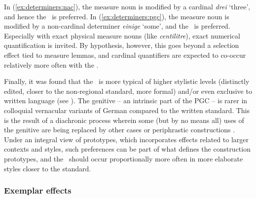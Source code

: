 \begin{exe}
  \ex\label{ex:determiners} 
  \begin{xlist}
  \end{xlist}
\end{exe}

In (\ref{ex:determiners:nac}), the measure noun is modified by a cardinal \textit{drei} `three', and hence the \NACa\ is preferred.
In (\ref{ex:determiners:pgc}), the measure noun is modified by a non-cardinal determiner \textit{einige} `some', and the \PGCa\ is preferred.
Especially with exact physical measure nouns (like \textit{centilitre}), exact numerical quantification is invited.
By hypothesis, however, this goes beyond a selection effect tied to measure lemmas, and cardinal quantifiers are expected to co-occur relatively more often with the \NACa.

Finally, it was found that the \PGCa\ is more typical of higher stylistic levels (distinctly edited, closer to the non-regional standard, more formal) and\slash or even exclusive to written language (see \citealp[320--323]{Hentschel1993}).
The genitive -- an intrinsic part of the PGC -- is rarer in colloquial vernacular variants of German compared to the written standard.
This is the result of a diachronic process wherein some (but by no means all) uses of the genitive are being replaced by other cases or periphrastic constructions \citep{FleischerSchallert2011}.
Under an integral view of prototypes, which incorporates effects related to larger contexts and styles, such preferences can be part of what defines the construction prototypes, and the \PGCa\ should occur proportionally more often in more elaborate styles closer to the standard.

\subsubsection{Exemplar effects}
\label{sec:exemplareffects}

